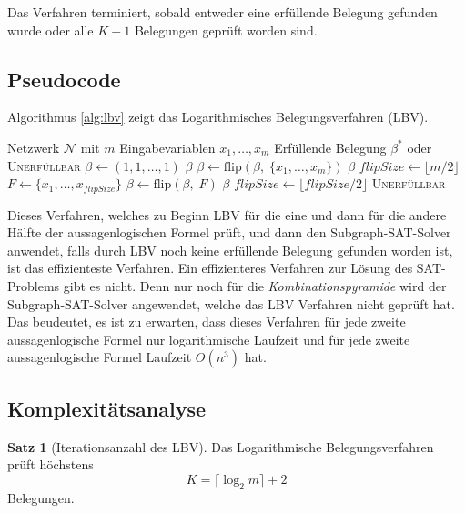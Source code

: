﻿\documentclass[a4paper,12pt]{article}
\theoremstyle{definition}
\newtheorem{satz}{Satz}
\begin{document}
Das Verfahren terminiert, sobald entweder eine erfüllende Belegung gefunden wurde oder
alle $K+1$ Belegungen geprüft worden sind.

\subsection{Pseudocode}
Algorithmus \ref{alg:lbv} zeigt das Logarithmisches Belegungsverfahren (LBV).
\begin{algorithm}[H]
	\caption{Logarithmisches Belegungsverfahren (LBV)}
	\label{alg:lbv}
	\begin{algorithmic}[1]
		\Require Netzwerk $\mathcal{N}$ mit $m$ Eingabevariablen $x_1, \ldots, x_m$
		\Ensure Erfüllende Belegung $\beta^*$ oder \textsc{Unerfüllbar}
		\State $\beta \gets (1, 1, \ldots, 1)$ 
		 \Return $\beta$ \EndIf
		\State $\beta \gets \mathrm{flip}(\beta,\; \{x_1, \ldots, x_m\})$ 
		 \Return $\beta$ \EndIf
		\State $\mathit{flipSize} \gets \lfloor m/2 \rfloor$
		\State $F \gets \{x_1, \ldots, x_{\mathit{flipSize}}\}$
		\State $\beta \gets \mathrm{flip}(\beta,\; F)$
		 \Return $\beta$ \EndIf
		\State $\mathit{flipSize} \gets \lfloor \mathit{flipSize}/2 \rfloor$
		\EndWhile
		\State \Return \textsc{Unerfüllbar}
	\end{algorithmic}
\end{algorithm}

Dieses Verfahren, welches zu Beginn LBV für die eine und dann für die andere Hälfte der aussagenlogischen Formel prüft, und dann den Subgraph-SAT-Solver anwendet, falls durch LBV noch keine erfüllende Belegung gefunden worden ist, ist das effizienteste Verfahren. Ein effizienteres Verfahren zur Lösung des SAT-Problems gibt es nicht. Denn nur noch für die \textit{Kombinationspyramide} wird der Subgraph-SAT-Solver angewendet, welche das LBV Verfahren nicht geprüft hat. Das beudeutet, es ist zu erwarten, dass dieses Verfahren für jede zweite aussagenlogische Formel nur logarithmische Laufzeit und für jede zweite aussagenlogische Formel Laufzeit $O(n^3)$ hat.

\subsection{Komplexitätsanalyse}

\begin{satz}[Iterationsanzahl des LBV]
	\label{satz:lbv-iterationen}
	Das Logarithmische Belegungsverfahren prüft höchstens
	\[
	K = \lceil \log_2 m \rceil + 2
	\]
	Belegungen.
\end{satz}
\end{document}
